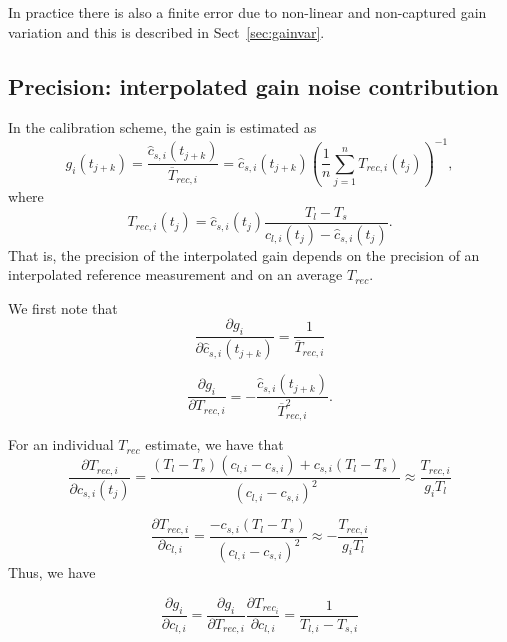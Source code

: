 In practice there is also a finite error due to non-linear and non-captured
gain variation and this is described in Sect~\ref{sec:gainvar}.

   
\subsection*{Precision: interpolated gain noise contribution}

In the calibration scheme, the gain is estimated as
\begin{equation}
g_{i}(t_{j+k}) = \frac{\hat{c}_{s,i}(t_{j+k})}{\overline{T}_{rec,i}} = \hat{c}_{s,i}(t_{j+k})\left(\frac{1}{n}\sum_{j=1}^{n}T_{rec,i}(t_{j})\right)^{-1}, 
\end{equation}
where
\begin{equation}
T_{rec,i}(t_{j}) = \hat{c}_{s,i}(t_{j}) \frac{ T_{l} - T_{s} }{  c_{l,i}(t_{j})- \hat{c}_{s,i}(t_{j})  }.
\end{equation}
That is, the precision of the interpolated gain depends on the precision of an interpolated
reference measurement and on an average \(T_{rec}\). 

We first note that
\begin{equation}
\frac{\partial g_{i}}{\partial \hat{c}_{s,i}(t_{j+k})} = \frac{1}{\overline{T}_{rec,i}}
\end{equation}

\begin{equation}
\frac{\partial g_{i}}{\partial T_{rec,i}} = - \frac{\hat{c}_{s,i}(t_{j+k})}{\overline{T}_{rec,i}^2}.
\end{equation}

For an individual \(T_{rec}\) estimate, we have that
\begin{equation}
 \frac{\partial T_{rec,i}}{\partial c_{s,i}(t_{j})} = \frac{(T_{l}-T_{s})(c_{l,i}-c_{s,i}) + c_{s,i}(T_{l}-T_{s})}
{(c_{l,i}-c_{s,i})^2} \approx \frac{T_{rec,i}}{g_{i}T_{l}}
\end{equation}

\begin{equation}
 \frac{\partial T_{rec,i}}{\partial c_{l,i}} = \frac{-c_{s,i}(T_{l}-T_{s})}{(c_{l,i}-c_{s,i})^2} \approx -\frac{T_{rec,i}}{g_{i}T_{l}}
\end{equation}
Thus, we have

\begin{equation}
 \frac{\partial g_{i}}{\partial c_{l,i}} = \frac{\partial g_{i}}{\partial T_{rec,i}}\frac{\partial T_{rec_{i}}}{\partial c_{l,i}}=
\frac{1}{T_{l,i}-T_{s,i}} 
\end{equation}

